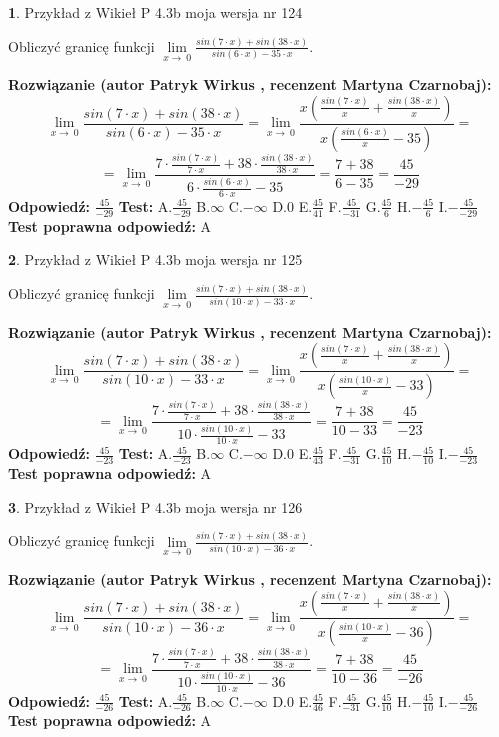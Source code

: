 \documentclass[12pt, a4paper]{article}
\theoremstyle{definition} %
\newtheorem{zad}{}
\newcommand{\zadStart}[1]{\begin{zad}#1\newline}
\newcommand{\zadStop}{\end{zad}}
\newcommand{\rozwStart}[2]{\noindent \textbf{Rozwiązanie (autor #1 , recenzent #2): }\newline}
\newcommand{\rozwStop}{\newline}
\newcommand{\odpStart}{\noindent \textbf{Odpowiedź:}\newline}
\newcommand{\odpStop}{\newline}
\newcommand{\testStart}{\noindent \textbf{Test:}\newline}
\newcommand{\testStop}{\newline}
\newcommand{\kluczStart}{\noindent \textbf{Test poprawna odpowiedź:}\newline}
\newcommand{\kluczStop}{\newline}
\begin{document}
\zadStart{Przykład z Wikieł P 4.3b moja wersja nr 124}


Obliczyć granicę funkcji $\lim\limits_{x\to\ 0}\frac{sin(7 \cdot x)+sin(38 \cdot x)}{sin(6 \cdot x)-35 \cdot x}$.
\zadStop
\rozwStart{Patryk Wirkus}{Martyna Czarnobaj}
$$\lim\limits_{x\to\ 0}\frac{sin(7 \cdot x)+sin(38 \cdot x)}{sin(6 \cdot x)-35 \cdot x}=\lim\limits_{x\to\ 0}\frac{x(\frac{sin(7 \cdot x)}{x}+\frac{sin(38 \cdot x)}{x})}{x(\frac{sin(6 \cdot x)}{x}-35)}=$$
$$=\lim\limits_{x\to\ 0}\frac{7 \cdot \frac{sin(7 \cdot x)}{7 \cdot x}+38 \cdot \frac{sin(38 \cdot x)}{38 \cdot x}}{6 \cdot \frac{sin(6 \cdot x)}{6 \cdot x}-35}=\frac{7+38}{6-35} = \frac{45}{-29}$$
\rozwStop
\odpStart
$\frac{45}{-29}$
\odpStop
\testStart
A.$\frac{45}{-29}$
B.$\infty$
C.$-\infty$
D.$0$
E.$\frac{45}{41}$
F.$\frac{45}{-31}$
G.$\frac{45}{6}$
H.$-\frac{45}{6}$
I.$-\frac{45}{-29}$
\testStop
\kluczStart
A
\kluczStop



\zadStart{Przykład z Wikieł P 4.3b moja wersja nr 125}


Obliczyć granicę funkcji $\lim\limits_{x\to\ 0}\frac{sin(7 \cdot x)+sin(38 \cdot x)}{sin(10 \cdot x)-33 \cdot x}$.
\zadStop
\rozwStart{Patryk Wirkus}{Martyna Czarnobaj}
$$\lim\limits_{x\to\ 0}\frac{sin(7 \cdot x)+sin(38 \cdot x)}{sin(10 \cdot x)-33 \cdot x}=\lim\limits_{x\to\ 0}\frac{x(\frac{sin(7 \cdot x)}{x}+\frac{sin(38 \cdot x)}{x})}{x(\frac{sin(10 \cdot x)}{x}-33)}=$$
$$=\lim\limits_{x\to\ 0}\frac{7 \cdot \frac{sin(7 \cdot x)}{7 \cdot x}+38 \cdot \frac{sin(38 \cdot x)}{38 \cdot x}}{10 \cdot \frac{sin(10 \cdot x)}{10 \cdot x}-33}=\frac{7+38}{10-33} = \frac{45}{-23}$$
\rozwStop
\odpStart
$\frac{45}{-23}$
\odpStop
\testStart
A.$\frac{45}{-23}$
B.$\infty$
C.$-\infty$
D.$0$
E.$\frac{45}{43}$
F.$\frac{45}{-31}$
G.$\frac{45}{10}$
H.$-\frac{45}{10}$
I.$-\frac{45}{-23}$
\testStop
\kluczStart
A
\kluczStop



\zadStart{Przykład z Wikieł P 4.3b moja wersja nr 126}


Obliczyć granicę funkcji $\lim\limits_{x\to\ 0}\frac{sin(7 \cdot x)+sin(38 \cdot x)}{sin(10 \cdot x)-36 \cdot x}$.
\zadStop
\rozwStart{Patryk Wirkus}{Martyna Czarnobaj}
$$\lim\limits_{x\to\ 0}\frac{sin(7 \cdot x)+sin(38 \cdot x)}{sin(10 \cdot x)-36 \cdot x}=\lim\limits_{x\to\ 0}\frac{x(\frac{sin(7 \cdot x)}{x}+\frac{sin(38 \cdot x)}{x})}{x(\frac{sin(10 \cdot x)}{x}-36)}=$$
$$=\lim\limits_{x\to\ 0}\frac{7 \cdot \frac{sin(7 \cdot x)}{7 \cdot x}+38 \cdot \frac{sin(38 \cdot x)}{38 \cdot x}}{10 \cdot \frac{sin(10 \cdot x)}{10 \cdot x}-36}=\frac{7+38}{10-36} = \frac{45}{-26}$$
\rozwStop
\odpStart
$\frac{45}{-26}$
\odpStop
\testStart
A.$\frac{45}{-26}$
B.$\infty$
C.$-\infty$
D.$0$
E.$\frac{45}{46}$
F.$\frac{45}{-31}$
G.$\frac{45}{10}$
H.$-\frac{45}{10}$
I.$-\frac{45}{-26}$
\testStop
\kluczStart
A
\kluczStop
\end{document}
